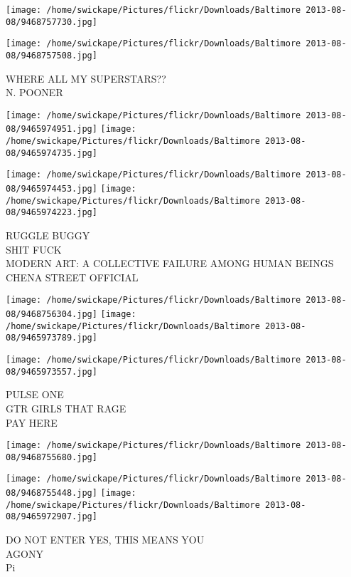 \documentclass[10pt,letterpaper]{article}
\begin{document}
\texttt{[image: /home/swickape/Pictures/flickr/Downloads/Baltimore 2013-08-08/9468757730.jpg]}

\vspace{0.25in}
\texttt{[image: /home/swickape/Pictures/flickr/Downloads/Baltimore 2013-08-08/9468757508.jpg]}

WHERE ALL MY SUPERSTARS??\\
N. POONER\\
\pagebreak

\texttt{[image: /home/swickape/Pictures/flickr/Downloads/Baltimore 2013-08-08/9465974951.jpg]}
\texttt{[image: /home/swickape/Pictures/flickr/Downloads/Baltimore 2013-08-08/9465974735.jpg]}

\texttt{[image: /home/swickape/Pictures/flickr/Downloads/Baltimore 2013-08-08/9465974453.jpg]}
\texttt{[image: /home/swickape/Pictures/flickr/Downloads/Baltimore 2013-08-08/9465974223.jpg]}

RUGGLE BUGGY\\
SHIT FUCK\\
MODERN ART: A COLLECTIVE FAILURE AMONG HUMAN BEINGS\\
CHENA STREET OFFICIAL\\
\pagebreak

\texttt{[image: /home/swickape/Pictures/flickr/Downloads/Baltimore 2013-08-08/9468756304.jpg]}
\texttt{[image: /home/swickape/Pictures/flickr/Downloads/Baltimore 2013-08-08/9465973789.jpg]}

\texttt{[image: /home/swickape/Pictures/flickr/Downloads/Baltimore 2013-08-08/9465973557.jpg]}

PULSE ONE\\
GTR GIRLS THAT RAGE\\
PAY HERE\\
\pagebreak

\texttt{[image: /home/swickape/Pictures/flickr/Downloads/Baltimore 2013-08-08/9468755680.jpg]}

\vspace{0.25in}
\texttt{[image: /home/swickape/Pictures/flickr/Downloads/Baltimore 2013-08-08/9468755448.jpg]}
\texttt{[image: /home/swickape/Pictures/flickr/Downloads/Baltimore 2013-08-08/9465972907.jpg]}

DO NOT ENTER YES, THIS MEANS YOU\\
AGONY\\
Pi\\
\pagebreak
\end{document}
